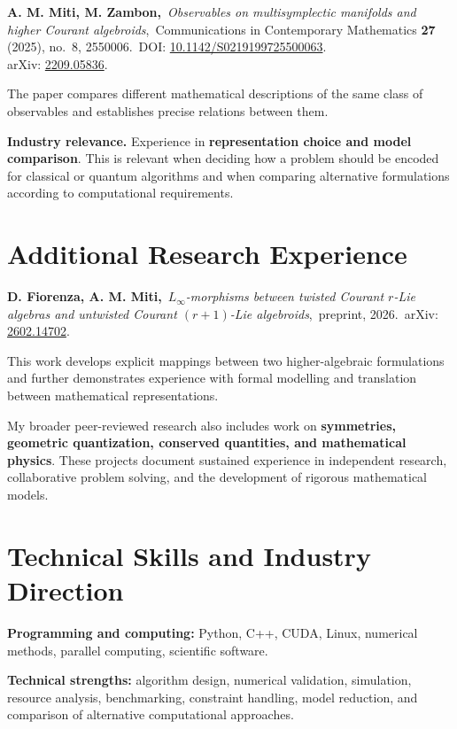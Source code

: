 \documentclass[10pt,a4paper]{article}
\newcommand{\relevance}[1]{\textbf{Industry relevance.} #1}
\begin{document}
\textbf{A. M. Miti, M. Zambon,}\
\textit{Observables on multisymplectic manifolds and higher Courant algebroids},\
Communications in Contemporary Mathematics \textbf{27} (2025), no.~8, 2550006.\
DOI: \href{https://doi.org/10.1142/S0219199725500063}{10.1142/S0219199725500063}.\\
arXiv: \href{https://arxiv.org/abs/2209.05836}{2209.05836}.

The paper compares different mathematical descriptions of the same class of observables and establishes precise
relations between them.

\relevance{Experience in \textbf{representation choice and model comparison}. This is relevant when deciding how a
problem should be encoded for classical or quantum algorithms and when comparing alternative formulations according
to computational requirements.}

\section*{Additional Research Experience}

\textbf{D. Fiorenza, A. M. Miti,}\
\textit{$L_\infty$-morphisms between twisted Courant $r$-Lie algebras and untwisted Courant $(r+1)$-Lie algebroids},\
preprint, 2026.\
arXiv: \href{https://arxiv.org/abs/2602.14702}{2602.14702}.

This work develops explicit mappings between two higher-algebraic formulations and further demonstrates experience
with formal modelling and translation between mathematical representations.

\vspace{0.3em}

My broader peer-reviewed research also includes work on \textbf{symmetries, geometric quantization, conserved quantities,
and mathematical physics}. These projects document sustained experience in independent research, collaborative problem
solving, and the development of rigorous mathematical models.

\section*{Technical Skills and Industry Direction}

\textbf{Programming and computing:} Python, C++, CUDA, Linux, numerical methods, parallel computing, scientific software.

\textbf{Technical strengths:} algorithm design, numerical validation, simulation, resource analysis, benchmarking,
constraint handling, model reduction, and comparison of alternative computational approaches.
\end{document}

